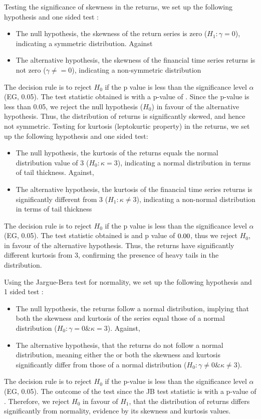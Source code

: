 \documentclass{article}
\begin{document}
Testing the significance of skewness in the returns, we set up the following hypothesis and one sided test :
\begin{itemize}
	\item The null hypothesis, the skewness of the return series is zero ($ H_1: \gamma = 0$), indicating a symmetric distribution. Against
	\item The alternative hypothesis, the skewness of the financial time series returns is not zero ($\gamma \neq = 0$), indicating a non-symmetric distribution
\end{itemize}
The decision rule is to reject $H_0$ if the p value is less than the significance level $\alpha$ (EG, 0.05). 
The test statistic obtained is \askewt with a p-value of \askewp. Since the p-value is less than 0.05, we reject the null hypothesis ($H_0$) in favour of the alternative hypothesis. 
Thus, the distribution of returns is significantly skewed, and hence not symmetric. 
Testing for kurtosis (leptokurtic property) in the returns, we set up the following hypothesis and one sided test:
\begin{itemize}
	\item The null hypothesis, the kurtosis of the returns equals the normal distribution value of 3 ($H_0 : \kappa = 3$), indicating a normal distribution in terms of tail thickness. Against, 
	\item The alternative hypothesis, the kurtosis of the financial time series returns is significantly different from 3 ($H_1 : \kappa \neq 3 $), indicating a non-normal distribution in terms of tail thickness
\end{itemize}
The decision rule is to reject $H_0$ if the p value is less than the significance level $\alpha$ (EG, 0.05). 
The test statistic obtained is \akurt and p value of $0.00$, thus we reject  $H_0$, in favour of the alternative hypothesis.
Thus, the returns have significantly different kurtosis from 3, confirming the presence of heavy tails in the distribution. 

Using the Jargue-Bera test for normality, we set up the following hypothesis and 1 sided test : 
\begin{itemize}
	\item The null hypothesis, the returns follow a normal distribution, implying that both the skewness and kurtosis of the series equal those of a normal distribution ($H_0 : \gamma = 0 \& \kappa = 3$). Against, 
	\item The alternative hypothesis, that the returns do not follow a normal distribution, meaning either the or both the skewness and kurtosis significantly differ from those of a normal distribution ($H_0 : \gamma \neq 0 \& \kappa \neq 3$). 
\end{itemize}
The decision rule is to reject $H_0$ if the p-value is less than the significance level $\alpha$ (EG, 0.05). 
The outcome of the test since the JB test statistic is \ajbt with a p-value of \ajbp. 
Therefore, we reject $H_0$ in favour of $H_1$, that the distribution of returns differs significantly from normality, evidence by its skewness and kurtosis values. 
\end{document}
